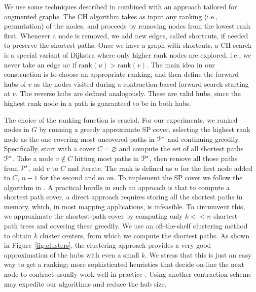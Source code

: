 We use some techniques described in \cite{hubimplem} combined with an approach tailored for augmented graphs.
The CH algorithm takes as input any ranking (i.e., permutation) of the nodes, and proceeds by removing nodes from the lowest rank first.
Whenever a node is removed, we add new edges, called shortcuts, if needed to preserve the shortest paths.
Once we have a graph with shortcuts, a CH search is a special variant of Dijkstra where only higher rank nodes are explored, i.e., we never take an edge $uv$ if rank$(u)>\text{rank}(v)$. 
The main idea in our construction is to choose an appropriate ranking, and then define the forward hubs of $v$ as the nodes visited during a contraction-based forward search starting at $v$.
The reverse hubs are defined analogously.
These are valid hubs, since the highest rank node in a path is guaranteed to be in both hubs.

The choice of the ranking function is crucial.
For our experiments, we ranked nodes in $G$ by running a greedy approximate SP cover, selecting the highest rank node as the one covering most uncovered paths in $\mathcal{P}^*$ and continuing greedily. 
Specifically, start with a cover $C=\varnothing$ and compute the set of all shortest paths $\mathcal{P}^*$.
Take a node $v\notin C$ hitting most paths in $\mathcal{P}^*$, then remove all those paths from $\mathcal{P}^*$, add $v$ to $C$ and iterate.
The rank is defined as $n$ for the first node added to $C$, $n-1$ for the second and so on.
To implement the SP cover we follow the algorithm in \cite{hubimplem}.
A practical hurdle in such an approach is that to compute a shortest path cover, a direct approach requires storing all the shortest paths in memory, which, in most mapping applications, is infeasible.
To circumvent this, we approximate the shortest-path cover by computing only $k<<n$ shortest-path trees and covering these greedily.
We use an off-the-shelf clustering method to obtain $k$ cluster centers, from which we compute the shortest paths. 
As shown in Figure~\ref{fig:clusters}, the clustering approach provides a very good approximation of the hubs with even a small $k$.
We stress that this is just an easy way to get a ranking; more sophisticated heuristics that decide on-line the next node to contract usually work well in practice \cite{goldberg_survey,rice_csp}.
Using another contraction scheme may expedite our algorithms and reduce the hub size.


